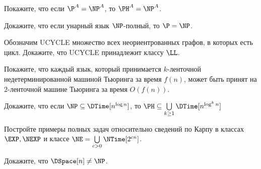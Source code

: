 

\begin{task}
    Покажите, что если $\P^A = \NP^A$, то $\PH^A = \NP^A$.
\end{task}

\begin{task}
    Докажите, что если унарный язык $\NP$-полный, то $\P = \NP$.
\end{task}

\begin{task}
	Обозначим UCYCLE множество всех неориентрованных графов, в которых есть цикл. Докажите, что UCYCLE принадлежит классу $\LL$. 
\end{task}



\breakline

\begin{ptask}{8}
    Покажите, что каждый язык, который принимается $k$-ленточной недетерминированной машиной Тьюринга за время $f(n)$, может быть
    принят на $2$-ленточной машине Тьюринга за время $O(f(n))$.
\end{ptask}


\begin{ptask}{32}
	Докажите, что если $\NP \subseteq \DTime[n^{\log n}]$, то $\PH \subseteq \bigcup\limits_{k \ge 1} \DTime[n^{\log^k n}]$    
\end{ptask}


\begin{ptask}{35}
	Постройте примеры полных задач относительно сведений по Карпу в классах $\EXP, \NEXP$ и классе $\NE = \bigcup\limits_{c > 0}
    \NTime[2^{cn}]$.
\end{ptask}

\begin{ptask}{39}
	Докажите, что $\DSpace[n] \neq \NP$.
\end{ptask}
